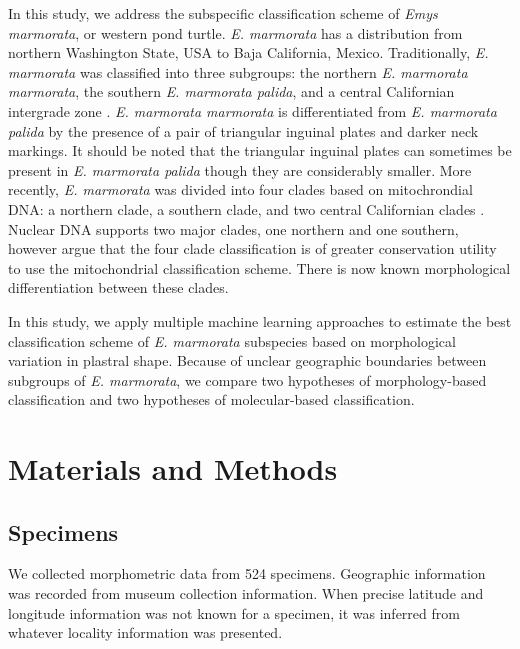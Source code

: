 \documentclass[12pt]{article}\usepackage{graphicx, color}
\begin{document}
In this study, we address the subspecific classification scheme of \textit{Emys marmorata}, or western pond turtle. \textit{E. marmorata} has a distribution from northern Washington State, USA to Baja California, Mexico.
Traditionally, \textit{E. marmorata} was classified into three subgroups: the northern \textit{E. marmorata marmorata}, the southern \textit{E. marmorata palida}, and a central Californian intergrade zone \citep{Seeliger1945}. \textit{E. marmorata marmorata} is differentiated from \textit{E. marmorata palida} by the presence of a pair of triangular inguinal plates and darker neck markings. It should be noted that the triangular inguinal plates can sometimes be present in \textit{E. marmorata palida} though they are considerably smaller.
More recently, \textit{E. marmorata} was divided into four clades based on mitochrondial DNA: a northern clade, a southern clade, and two central Californian clades \citep{Spinks2005,Spinks2010}. Nuclear DNA supports two major clades, one northern and one southern, however \citet{Spinks2010} argue that the four clade classification is of greater conservation utility to use the mitochondrial classification scheme.
There is now known morphological differentiation between these clades.

In this study, we apply multiple machine learning approaches to estimate the best classification scheme of \textit{E. marmorata} subspecies based on morphological variation in plastral shape. Because of unclear geographic boundaries between subgroups of \textit{E. marmorata}, we compare two hypotheses of morphology-based classification and two hypotheses of molecular-based classification.


\section{Materials and Methods}
\subsection{Specimens}
We collected morphometric data from 524 specimens. Geographic information was recorded from museum collection information. When precise latitude and longitude information was not known for a specimen, it was inferred from whatever locality information was presented. %
\end{document}
